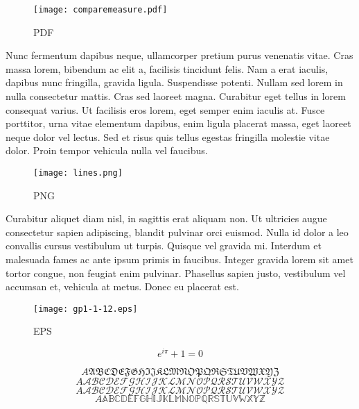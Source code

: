 \documentclass[12pt]{article}
\begin{document}
\begin{figure}
  \centering
  \texttt{[image: comparemeasure.pdf]}
  \caption{PDF}
  \label{fig:pdf}
\end{figure}

Nunc fermentum dapibus neque, ullamcorper pretium purus venenatis
vitae. Cras massa lorem, bibendum ac elit a, facilisis tincidunt
felis. Nam a erat iaculis, dapibus nunc fringilla, gravida
ligula. Suspendisse potenti. Nullam sed lorem in nulla consectetur
mattis. Cras sed laoreet magna. Curabitur eget tellus in lorem
consequat varius. Ut facilisis eros lorem, eget semper enim iaculis
at. Fusce porttitor, urna vitae elementum dapibus, enim ligula
placerat massa, eget laoreet neque dolor vel lectus. Sed et risus quis
tellus egestas fringilla molestie vitae dolor. Proin tempor vehicula
nulla vel faucibus.

\begin{figure}
  \centering
  \texttt{[image: lines.png]}
  \caption{PNG}
  \label{fig:png}
\end{figure}

Curabitur aliquet diam nisl, in sagittis erat aliquam non. Ut
ultricies augue consectetur sapien adipiscing, blandit pulvinar orci
euismod. Nulla id dolor a leo convallis cursus vestibulum ut
turpis. Quisque vel gravida mi. Interdum et malesuada fames ac ante
ipsum primis in faucibus. Integer gravida lorem sit amet tortor
congue, non feugiat enim pulvinar. Phasellus sapien justo, vestibulum
vel accumsan et, vehicula at metus. Donec eu placerat est.

\begin{figure}
  \centering
  \texttt{[image: gp1-1-12.eps]}
  \caption{EPS}
  \label{fig:eps}
\end{figure}

\begin{equation}
  \label{eq:euler_identity}
  e^{i\pi} + 1 = 0
\end{equation}

\[A \mathfrak{ABCDEFGHIJKLMNOPQRSTUVWXYZ}\]
\[A \mathscr{ABCDEFGHIJKLMNOPQRSTUVWXYZ}\]
\[A \mathcal{ABCDEFGHIJKLMNOPQRSTUVWXYZ}\]
\[A \mathbb{ABCDEFGHIJKLMNOPQRSTUVWXYZ}\]

\end{document}
